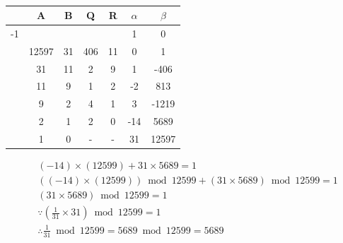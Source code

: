 \documentclass[12pt]{article}
\newenvironment{sol}[1][Solution]{\begin{trivlist}\item[\hskip\labelsep {\bfseries #1:}]}{\end{trivlist}}
\begin{document}
\begin{enumerate}
                  \begin{sol}
        \hspace*{\fill} \\
            \begin{center}
                \begin{tabular}{|c|c|c|c|c|c|c|}
                \hline
                     & A & B&Q &R &$\alpha$ & $\beta$  \\ 
                     \hline
                                       -1 &  & & & & 1 & 0 \\ 
                     \hline
                        & 12597 & 31 & 406 & 11 & 0 & 1 \\ 
                     \hline
                           &  31 & 11 & 2 & 9  & 1& -406 \\ 
                     \hline
                               &  11 & 9 & 1 & 2 & -2&  813  \\      
                     \hline
                             & 9 &2 &4 &1& 3& -1219 \\ 
                     \hline
                          & 2 &1 &2 &0 & -14& 5689 \\ 
                     \hline
                         & 1 &0 &- &-& 31 & 12597 \\ 
                     \hline

                \end{tabular}
            \end{center}
            \begin{align*}
                &(-14) \times(12599)  + 31 \times 5689 = 1\\
                &((-14) \times(12599)) \bmod 12599 +(31 \times 5689 )\bmod 12599 = 1\\
                & (31 \times 5689 ) \bmod 12599 = 1\\
                & \because (\frac{1}{31} \times 31) \bmod 12599  = 1 \\
                & \therefore \frac{1}{31}\bmod 12599  = 5689 \bmod 12599=5689 \\
            \end{align*}
        \end{sol}



\end{enumerate}
\end{document}
